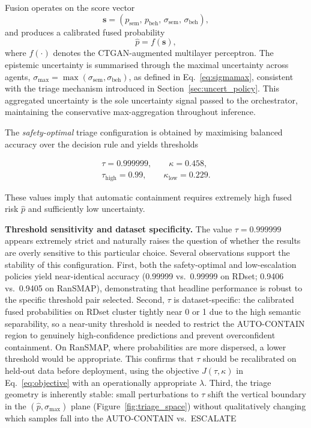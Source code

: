 \documentclass[lettersize,journal]{IEEEtran}
\begin{document}
Fusion operates on the score vector
\begin{equation}
\mathbf{s} = \left(p_{\mathrm{sem}},\, p_{\mathrm{beh}},\, \sigma_{\mathrm{sem}},\, \sigma_{\mathrm{beh}}\right),
\label{eq:scorevector}
\end{equation}
and produces a calibrated fused probability
\begin{equation}
\hat{p} = f(\mathbf{s}),
\label{eq:fusedp}
\end{equation}
where \(f(\cdot)\) denotes the CTGAN-augmented multilayer perceptron. The epistemic uncertainty is summarised through the maximal uncertainty across agents,
$\sigma_{\max} = \max(\sigma_{\mathrm{sem}}, \sigma_{\mathrm{beh}})$, as defined in
Eq.~\eqref{eq:sigmamax}, consistent with the triage mechanism introduced in
Section~\ref{sec:uncert_policy}. This aggregated uncertainty is the sole uncertainty signal
passed to the orchestrator, maintaining the conservative max-aggregation throughout inference.

The \emph{safety-optimal} triage configuration is obtained by maximising balanced accuracy over the decision rule and yields thresholds

\begin{gather}
\tau = 0.999999,\qquad  \kappa = 0.458, \\
\tau_{\mathrm{high}} = 0.99,\qquad \kappa_{\mathrm{low}} = 0.229.
\label{eq:policy_safety}
\end{gather}


These values imply that automatic containment requires extremely high fused risk \(\hat{p}\)
and sufficiently low uncertainty.


\cbstart
\noindent\textbf{Threshold sensitivity and dataset specificity.}
The value $\tau = 0.999999$
\cbend
 appears extremely strict and naturally raises the question of
whether the results are overly sensitive to this particular choice. Several observations
support the stability of this configuration. First, both the safety-optimal and
low-escalation policies yield near-identical accuracy (0.99999 vs.\ 0.99999 on RDset;
0.9406 vs.\ 0.9405 on RanSMAP), demonstrating that headline performance is robust to the
specific threshold pair selected. Second, $\tau$ is dataset-specific: the calibrated fused
probabilities on RDset cluster tightly near 0 or 1 due to the high semantic separability,
so a near-unity threshold is needed to restrict the AUTO-CONTAIN region to genuinely
high-confidence predictions and prevent overconfident containment. On RanSMAP, where
probabilities are more dispersed, a lower threshold would be appropriate. This confirms
that $\tau$ should be recalibrated on held-out data before deployment, using the objective
$J(\tau,\kappa)$ in Eq.~\eqref{eq:objective} with an operationally appropriate $\lambda$.
Third, the triage geometry is inherently stable: small perturbations to $\tau$ shift the
vertical boundary in the $(\hat{p}, \sigma_{\max})$ plane (Figure~\ref{fig:triage_space})
without qualitatively changing which samples fall into the AUTO-CONTAIN vs.\ ESCALATE
\end{document}
